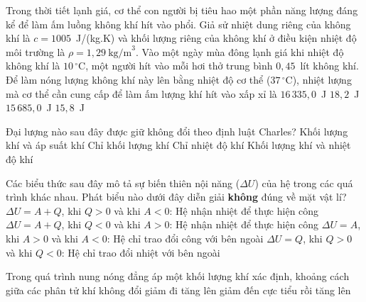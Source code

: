	\begin{ex}%
		Trong thời tiết lạnh giá, cơ thể con người bị tiêu hao một phần năng lượng đáng kể để làm ấm luồng không khí hít vào phổi. Giả sử nhiệt dung riêng của không khí là $c=1005$~J/(kg.K) và khối lượng riêng của không khí ở điều kiện nhiệt độ môi trường là $\rho=1{,}29~\text{kg/m}^3$. Vào một ngày mùa đông lạnh giá khi nhiệt độ không khí là $10\,^\circ\text{C}$, một người hít vào mỗi hơi thở trung bình $0{,}45$~lít không khí. Để làm nóng lượng không khí này lên bằng nhiệt độ cơ thể ($37\,^\circ\text{C}$), nhiệt lượng mà cơ thể cần cung cấp để làm ấm lượng khí hít vào xấp xỉ là
		\choice
		{$16\,335{,}0$~J}
		{$18{,}2$~J}
		{$15\,685{,}0$~J}
		{\True $15{,}8$~J}
	\end{ex}

	\begin{ex}%
		Đại lượng nào sau đây được giữ không đổi theo định luật Charles?
		\choice
		{\True Khối lượng khí và áp suất khí}
		{Chỉ khối lượng khí}
		{Chỉ nhiệt độ khí}
		{Khối lượng khí và nhiệt độ khí}
	\end{ex}

	\begin{ex}%
		Các biểu thức sau đây mô tả sự biến thiên nội năng ($\Delta U$) của hệ trong các quá trình khác nhau. Phát biểu nào dưới đây diễn giải \textbf{không} đúng về mặt vật lí?
		\choice
		{$\Delta U=A+Q$, khi $Q>0$ và khi $A<0$: Hệ nhận nhiệt để thực hiện công}
		{\True $\Delta U=A+Q$, khi $Q<0$ và khi $A>0$: Hệ nhận nhiệt để thực hiện công}
		{$\Delta U=A$, khi $A>0$ và khi $A<0$: Hệ chỉ trao đổi công với bên ngoài}
		{$\Delta U=Q$, khi $Q>0$ và khi $Q<0$: Hệ chỉ trao đổi nhiệt với bên ngoài}
	\end{ex}

	\begin{ex}%
		Trong quá trình nung nóng đẳng áp một khối lượng khí xác định, khoảng cách giữa các phân tử khí
		\choice
		{không đổi}
		{giảm đi}
		{\True tăng lên}
		{giảm đến cực tiểu rồi tăng lên}
	\end{ex}

